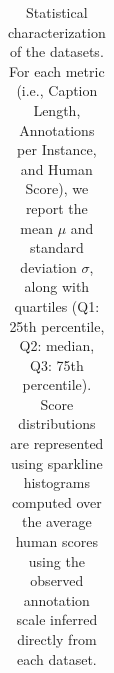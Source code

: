 \begin{table}[t]
{\begin{tabular}{lcccccc}
\bottomrule
\end{tabular}
}
\caption{Statistical characterization of the datasets. For each metric (i.e., Caption Length, Annotations per Instance, and Human Score), we report the mean $\mu$ and standard deviation $\sigma$, along with quartiles (Q1: 25th percentile, Q2: median, Q3: 75th percentile). Score distributions are represented using sparkline histograms computed over the average human scores using the observed annotation scale inferred directly from each dataset.}
\label{tab:dataset_statistics}
\end{table}